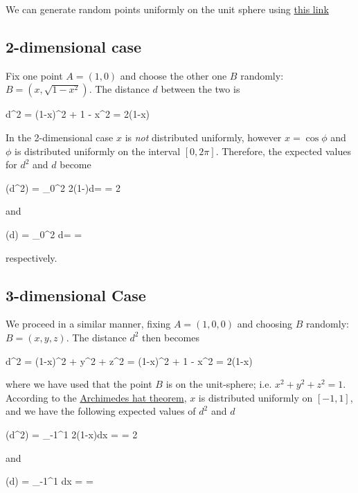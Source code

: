 

We can generate random points uniformly on the unit sphere using \href{https://stats.stackexchange.com/questions/7977/how-to-generate-uniformly-distributed-points-on-the-surface-of-the-3-d-unit-sphe}{this link}

\subsection{2-dimensional case}

Fix one point $A = (1,0)$ and choose the other one $B$ randomly: $B = (x, \sqrt{1-x^2})$. The distance $d$ between the two is

\bee
d^2 = (1-x)^2 + 1 - x^2 = 2(1-x)
\eee

In the 2-dimensional case $x$ is \emph{not} distributed uniformly, however $x = \cos \phi$ and $\phi$ is distributed uniformly on the interval $[0, 2\pi]$. Therefore, the expected values for $d^2$ and $d$ become

\bee
\mE(d^2) =  \int_0^{2\pi} 2(1-\cos \phi)d\phi = \cdots = 2
\eee

and

\bee
\mE(d) =  \int_0^{2\pi}  d\phi = \cdots = 
\eee

respectively.

\subsection{3-dimensional Case}

We proceed in a similar manner, fixing $A = (1,0,0)$ and choosing $B$ randomly: $B = (x,y,z)$. The distance $d^2$ then becomes

\bee
d^2 = (1-x)^2 + y^2 + z^2 = (1-x)^2 + 1 - x^2 = 2(1-x)
\eee

where we have used that the point $B$ is on the unit-sphere; i.e. $x^2 + y^2 + z^2 = 1$. According to the \href{http://mathworld.wolfram.com/ArchimedesHat-BoxTheorem.html}{Archimedes hat theorem}, $x$ is distributed uniformly on $[-1,1]$, and we have the following expected values of $d^2$ and $d$

\bee
\mE(d^2) =  \int_{-1}^{1} 2(1-x)dx = \cdots = 2
\eee

and

\bee
\mE(d) =  \int_{-1}^{1}  dx = \cdots = 
\eee

